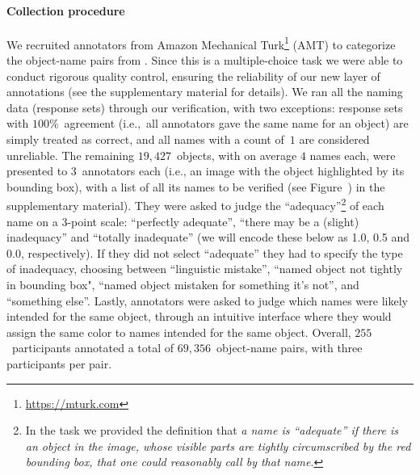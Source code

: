 
\paragraph{Collection procedure}
\label{sect:mn_verification}

We recruited annotators from Amazon Mechanical Turk\footnote{
	\url{https://mturk.com}
} (AMT) to categorize the object-name pairs from \mn.
Since this is a multiple-choice task we were able to conduct rigorous quality control, ensuring the reliability of our new layer of annotations (see the supplementary material for details).
We ran all the \mn naming data (response sets) through our verification, with two exceptions: 
response sets with $100$\%~agreement (i.e.,~all annotators gave the same name for an object) are simply treated as correct, and all names with a count of~$1$ are considered unreliable.
The remaining $19,427$~objects, with on average $4$ names each, were presented to $3$~annotators each (i.e., an image with the object highlighted by its bounding box), with a list of all its names to be verified (see Figure~) in the supplementary material).
They were asked to judge the ``adequacy''\footnote{
	In the task we provided the definition that \textit{a name is ``adequate'' if there is an object in the image, whose visible parts are tightly circumscribed by the red bounding box, that one could reasonably call by that name}.
} of each name on a 3-point scale: ``perfectly adequate'', ``there may be a (slight) inadequacy'' and ``totally inadequate'' (we will encode these below as 1.0, 0.5 and 0.0, respectively).
If they did not select ``adequate'' they had to specify the type of inadequacy, choosing between ``linguistic mistake'', ``named object not tightly in bounding box",  ``named object mistaken for something it's not'', and ``something else''.
Lastly, annotators were asked to judge which names were likely intended for the same object, through an intuitive interface where they would assign the same color to names intended for the same object.
Overall, $255$~participants annotated a total of $69,356$~object-name pairs, with three participants per pair.




